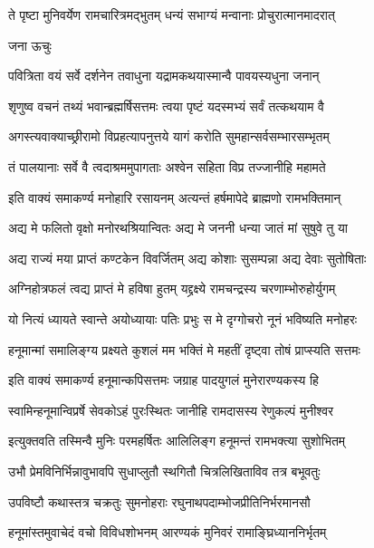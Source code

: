 

\twolineshloka
{ते पृष्टा मुनिवर्येण रामचारित्रमद्भुतम्}
{धन्यं सभाग्यं मन्वानाः प्रोचुरात्मानमादरात्}%

जना ऊचुः

\twolineshloka
{पवित्रिता वयं सर्वे दर्शनेन तवाधुना}
{यद्रामकथयास्मान्वै पावयस्यधुना जनान्}%

\twolineshloka
{शृणुष्व वचनं तथ्यं भवान्ब्रह्मर्षिसत्तमः}
{त्वया पृष्टं यदस्मभ्यं सर्वं तत्कथयाम वै}%

\twolineshloka
{अगस्त्यवाक्याच्छ्रीरामो विप्रहत्यापनुत्तये}
{यागं करोति सुमहान्सर्वसम्भारसम्भृतम्}%

\twolineshloka
{तं पालयानाः सर्वे वै त्वदाश्रममुपागताः}
{अश्वेन सहिता विप्र तज्जानीहि महामते}%

\twolineshloka
{इति वाक्यं समाकर्ण्य मनोहारि रसायनम्}
{अत्यन्तं हर्षमापेदे ब्राह्मणो रामभक्तिमान्}%

\twolineshloka
{अद्य मे फलितो वृक्षो मनोरथश्रियान्वितः}
{अद्य मे जननी धन्या जातं मां सुषुवे तु या}%

\twolineshloka
{अद्य राज्यं मया प्राप्तं कण्टकेन विवर्जितम्}
{अद्य कोशाः सुसम्पन्ना अद्य देवाः सुतोषिताः}%

\twolineshloka
{अग्निहोत्रफलं त्वद्य प्राप्तं मे हविषा हुतम्}
{यद्द्रक्ष्ये रामचन्द्रस्य चरणाम्भोरुहोर्युगम्}%

\twolineshloka
{यो नित्यं ध्यायते स्वान्ते अयोध्यायाः पतिः प्रभुः}
{स मे दृग्गोचरो नूनं भविष्यति मनोहरः}%

\twolineshloka
{हनूमान्मां समालिङ्ग्य प्रक्ष्यते कुशलं मम}
{भक्तिं मे महतीं दृष्ट्वा तोषं प्राप्स्यति सत्तमः}%

\twolineshloka
{इति वाक्यं समाकर्ण्य हनूमान्कपिसत्तमः}
{जग्राह पादयुगलं मुनेरारण्यकस्य हि}%

\twolineshloka
{स्वामिन्हनूमान्विप्रर्षे सेवकोऽहं पुरःस्थितः}
{जानीहि रामदासस्य रेणुकल्पं मुनीश्वर}%

\twolineshloka
{इत्युक्तवति तस्मिन्वै मुनिः परमहर्षितः}
{आलिलिङ्ग हनूमन्तं रामभक्त्या सुशोभितम्}%

\twolineshloka
{उभौ प्रेमविनिर्भिन्नावुभावपि सुधाप्लुतौ}
{स्थगितौ चित्रलिखिताविव तत्र बभूवतुः}%

\twolineshloka
{उपविष्टौ कथास्तत्र चक्रतुः सुमनोहराः}
{रघुनाथपदाम्भोजप्रीतिनिर्भरमानसौ}%

\twolineshloka
{हनूमांस्तमुवाचेदं वचो विविधशोभनम्}
{आरण्यकं मुनिवरं रामाङ्घ्रिध्याननिर्भृतम्}%

